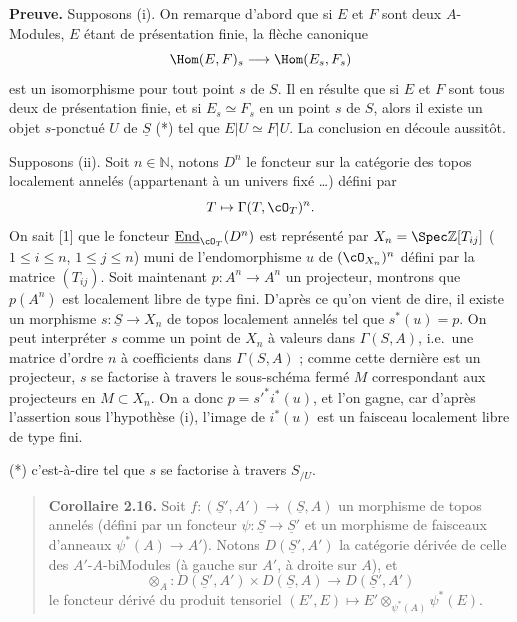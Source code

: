 \textbf{Preuve.} Supposons (i). On remarque d'abord que si $E$ et $F$ sont deux $A$-Modules, $E$ étant de présentation finie, la flèche canonique
\[
\Hom(E, F)_s \longrightarrow \Hom(E_s, F_s)
\]
est un isomorphisme pour tout point $s$ de $S$. Il en résulte que si $E$ et $F$ sont tous deux de présentation finie, et si $E_s \simeq F_s$ en un point $s$ de $S$, alors il existe un objet $s$-ponctué $U$ de $\underline{S}$ (*) tel que $E|U \simeq F|U$. La conclusion en découle aussitôt.

Supposons (ii). Soit $n \in \mathbb{N}$, notons $D^n$ le foncteur sur la catégorie des topos localement annelés (appartenant à un univers fixé \ldots) défini par
\[
T \mapsto \Gamma(T, \cO_T)^n.
\]
On sait [1] que le foncteur $\underline{\mathrm{End}}_{\cO_T}(D^n)$ est représenté par $X_n = \Spec \mathbb{Z}[T_{ij}]$ ($1 \leqslant i \leqslant n$, $1 \leqslant j \leqslant n$) muni de l'endomorphisme $u$ de $(\cO_{X_n})^n$ défini par la matrice $(T_{ij})$. Soit maintenant $p : A^n \to A^n$ un projecteur, montrons que $p(A^n)$ est localement libre de type fini. D'après ce qu'on vient de dire, il existe un morphisme $s : \underline{S} \to X_n$ de topos localement annelés tel que $s^*(u) = p$. On peut interpréter $s$ comme un point de $X_n$ à valeurs dans $\Gamma(S, A)$, i.e.\ une matrice d'ordre $n$ à coefficients dans $\Gamma(S, A)$ ; comme cette dernière est un projecteur, $s$ se factorise à travers le sous-schéma fermé $M$ correspondant aux projecteurs en $M \subset X_n$. On a donc $p = s'^* i^*(u)$, et l'on gagne, car d'après l'assertion sous l'hypothèse (i), l'image de $i^*(u)$ est un faisceau localement libre de type fini.

(*) c'est-à-dire tel que $s$ se factorise à travers $S_{/U}$.

\begin{quote}
\textbf{Corollaire 2.16.} Soit $f : (\underline{S}', A') \to (\underline{S}, A)$ un morphisme de topos annelés (défini par un foncteur $\psi : \underline{S} \to \underline{S}'$ et un morphisme de faisceaux d'anneaux $\psi^*(A) \to A'$). Notons $D(\underline{S}', A')$ la catégorie dérivée de celle des $A'$-$A$-biModules (à gauche sur $A'$, à droite sur $A$), et
\[
\otimes_{A} : D(\underline{S}', A') \times D(\underline{S}, A) \longrightarrow D(\underline{S}', A')
\]
le foncteur dérivé du produit tensoriel $(E', E) \mapsto E' \otimes_{\psi^*(A)} \psi^*(E)$.
\end{quote}

